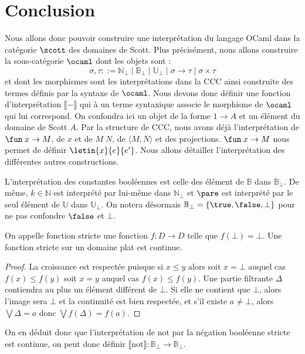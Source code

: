 \part{Conclusion}

Nous allons donc pouvoir construire une interprétation du langage OCaml dans la catégorie $\scott$ des domaines de Scott. Plus précisément, nous allons construire la sous-catégorie $\ocaml$ dont les objets sont :
$$\sigma,\tau ::= \mathbb N_\bot \mid \mathbb B_\bot \mid \mathbb U_\bot \mid \sigma\to\tau\mid \sigma\times \tau$$ et dont les morphismes sont les interprétations dans la CCC ainsi construite des termes définis par la syntaxe de $\ocaml$. Nous devons donc définir une fonction d'interprétation $\llbracket - \rrbracket$ qui à un terme syntaxique associe le morphisme de $\ocaml$ qui lui correspond. On confondra ici un objet de la forme $1\to A$ et un élément du domaine de Scott $A$. Par la structure de CCC, nous avons déjà l'interprétation de $\fun\;x\to M$, de $x$ et de $M\; N$, de $\langle M,N\rangle$ et des projections. $\fun\;x\to M$ nous permet de définir $\letin{x}{e}{e'}$. Nous allons détailler l'interprétation des différentes autres constructions.

L'interprétation des constantes booléennes est celle des élément de $\mathbb B$ dans $\mathbb B_\bot$. De même, $k\in\mathbb N$ est interprété par lui-même dans $\mathbb N_\bot$ et $\pare$ est interprété par le seul élément de $\mathbb U$ dans $\mathbb U_\bot$. On notera désormais $\mathbb B_\bot = \{\true,\false,\bot\}$ pour ne pas confondre $\false$ et $\bot$.

\begin{prop}
    On appelle fonction stricte une fonction $f : D\to D$ telle que $f(\bot)=\bot$.
    Une fonction stricte sur un domaine plat est continue.
\end{prop}
\begin{proof}
    La croissance est respectée puisque si $x\leq y$ alors soit $x=\bot$ auquel cas $f(x)\leq f(y)$ soit $x=y$ auquel cas $f(x)\leq f(y)$. Une partie filtrante $\Delta$ contiendra au plus un élément différent de $\bot$. Si elle ne contient que $\bot$, alors l'image sera $\bot$ et la continuité est bien respectée, et s'il existe $a\neq \bot$, alors $\bigvee\Delta = a$ donc $\bigvee f(\Delta)=f(a)$.
\end{proof}

On en déduit donc que l'interprétation de $\mathrm{not}$ par la négation booléenne stricte est continue, on peut donc définir $\llbracket\mathrm{not}\rrbracket : \mathbb B_\bot \to \mathbb B_\bot$.

